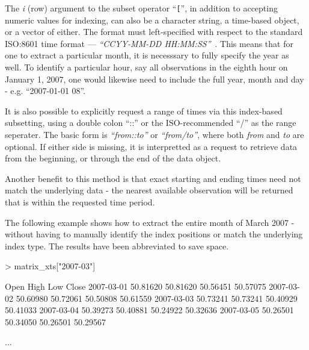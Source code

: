 \documentclass{article}
\begin{document}
The {\em i} (row)
argument to the subset operator ``{\tt [}'', in addition to accepting numeric
values for indexing,
can also be a character string, a time-based object, or a vector of either.
The format must left-specified with respect to the standard ISO:8601 
time format --- {\em ``CCYY-MM-DD HH:MM:SS''}~\cite{ISO}.  This means that for one 
to extract a particular month, it is necesssary to fully specify the 
year as well. To identify a particular hour, say all observations
in the eighth hour on January 1, 2007, one would likewise need
to include the full year, month and day - e.g. ``2007-01-01 08''. 

It is also possible to explicitly request a range of times via
this index-based subsetting, using a double colon ``::''
or the ISO-recommended ``/'' as the range seperater.
The basic form is {\em ``from::to''} or {\em ``from/to''},
where both {\em from} and {\em to}
are optional.  If either side is missing, it is interpretted as
a request to retrieve data from the beginning, or through the end of the
data object.

Another benefit to this method is that exact starting and ending
times need not match the underlying data - the nearest available
observation will be returned that is within the requested time
period.

The following example shows how
to extract the entire month of March 2007 - without having to
manually identify the index positions or match the underlying
index type. The results have been abbreviated to save space.
\begin{Schunk}
\begin{Sinput}
> matrix_xts["2007-03"]
\end{Sinput}
\end{Schunk}
\begin{Schunk}
\begin{Soutput}
               Open     High      Low    Close
2007-03-01 50.81620 50.81620 50.56451 50.57075
2007-03-02 50.60980 50.72061 50.50808 50.61559
2007-03-03 50.73241 50.73241 50.40929 50.41033
2007-03-04 50.39273 50.40881 50.24922 50.32636
2007-03-05 50.26501 50.34050 50.26501 50.29567
\end{Soutput}
\begin{Soutput}
...
\end{Soutput}
\end{Schunk}
\end{document}
